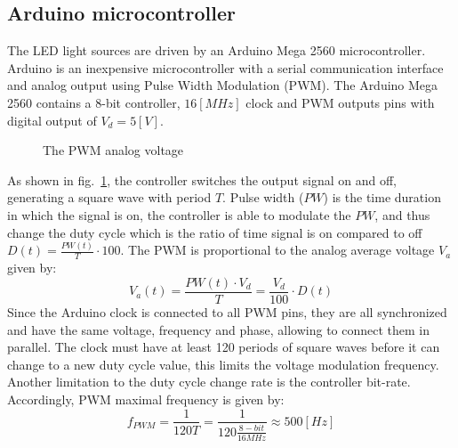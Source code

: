\documentclass[\main/master.tex]{subfiles}
\begin{document}
\subsection{Arduino microcontroller}
The LED light sources are driven by an Arduino Mega 2560 microcontroller. Arduino is an inexpensive microcontroller with a serial communication interface and analog output using Pulse Width Modulation (PWM). The Arduino Mega 2560 contains a 8-bit controller, $16 [MHz]$ clock and PWM outputs pins with digital output of $V_d = 5[V]$.
\begin{figure}[htbp]
	\centering
	\caption[The PWM analog voltage]{The PWM analog voltage}
	\label{fig:duty_cycle}
\end{figure}
\FloatBarrier
\par\noindent
As shown in fig.~\ref{fig:duty_cycle}, the controller switches the output signal on and off, generating a square wave with period $T$. Pulse width ($PW$) is the time duration in which the signal is on, the controller is able to modulate the $PW$, and thus change the duty cycle which is the ratio of time signal is on compared to off $D(t) = \frac{PW(t)}{T}\cdot 100$. The PWM is proportional to the analog average voltage $V_a$ given by: 
\begin{equation}
V_a(t) = \frac{ PW(t)\cdot V_d}{ T}  = \frac{V_d}{100}\cdot D(t)   \label{eqn:pwm voltage}
\end{equation}
Since the Arduino clock is connected to all PWM pins, they are all synchronized and have the same voltage, frequency and phase, allowing to connect them in parallel. The clock must have at least 120 periods of square waves before it can change to a new duty cycle value, this limits the voltage modulation frequency. Another limitation to the duty cycle change rate is the controller bit-rate. Accordingly, PWM maximal frequency is given by:
\begin{equation}
f_{PWM} = \frac{1 }{120T}= \frac{1 }{120 \frac{8-bit }{16MHz}}  \approx 500[Hz]	    \label{eqn:pwm frequency}
\end{equation}
\end{document}
